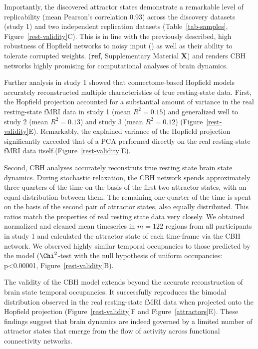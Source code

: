 \documentclass{article}
\begin{document}
Importantly, the discovered attractor states demonstrate a remarkable level of replicability (mean Pearson's correlation 0.93) across the discovery datasets (study 1) and two independent replication datasets (Table~\ref{tab-samples}, Figure~\ref{rest-validity}C).
This is in line with the previously described, high robustness of Hopfield networks to noisy input (\href{https://doi.org/10.1073/pnas.79.8.2554}{}) as well as their ability to tolerate corrupted weights. (\textbf{ref}, Supplementary Material \textbf{X}) and renders CBH networks highly promising for computational analyses of brain dynamics.

Further analysis in study 1 showed that connectome-based Hopfield models accurately reconstructed multiple characteristics of true resting-state data.
First, the Hopfield projection accounted for a substantial amount of variance in the real resting-state fMRI data in study 1 (mean $R^2=0.15$) and generalized well to study 2 (mean $R^2=0.13$) and study 3 (mean $R^2=0.12$) (Figure~\ref{rest-validity}E).
Remarkably, the explained variance of the Hopfield projection significantly exceeded that of a PCA performed directly on the real resting-state fMRI data itself.(Figure~\ref{rest-validity}E).

Second, CBH analyses accurately reconstruts true resting state brain state dynamics.
During stochastic relaxation, the CBH network spends approximately three-quarters of the time on the basis of the first two attractor states, with an equal distribution between them.
The remaining one-quarter of the time is spent on the basis of the second pair of attractor states, also equally distributed.
This ratios match the properties of real resting state data very closely. We obtained normalized and cleaned mean timeseries in $m=122$ regions from all participants in study 1 and calculated the attractor state of each time-frame via the CBH network. We observed highly similar temporal occupancies to those predicted by the model ($\Chi^2$-test with the null hypothesis of uniform occupancies: p\textless 0.00001, Figure~\ref{rest-validity}B).

The validity of the CBH model extends beyond the accurate reconstruction of brain state temporal occupancies. It successfully reproduces the bimodal distribution observed in the real resting-state fMRI data when projected onto the Hopfield projection (Figure~\ref{rest-validity}F and Figure~\ref{attractors}E). These findings suggest that brain dynamics are indeed governed by a limited number of attractor states that emerge from the flow of activity across functional connectivity networks.
\end{document}
